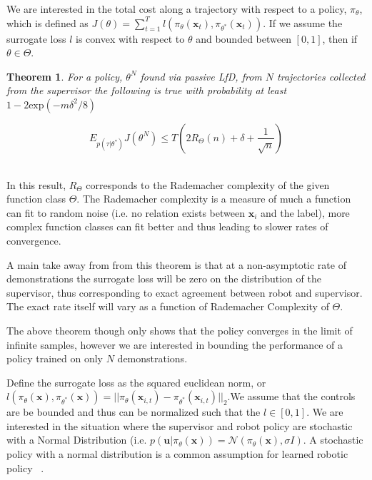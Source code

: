 \documentclass[10pt, conference]{ieeeconf}      %
\newtheorem{theorem}{Theorem}[section]
\newcommand{\bu}{\mathbf{u}}
\newcommand{\bx}{\mathbf{x}}
\begin{document}
We are interested in the total cost along a trajectory with respect to a policy, $\pi_{\theta}$, which is defined as $J(\theta) = \sum^T_{t=1} l(\pi_{\theta}(\bx_{t}),\pi_{\theta^*}(\bx_{t}))$.  If we assume the surrogate loss $l$ is convex with respect to $\theta$ and bounded between $[0,1]$, then if $\theta \in \Theta$. \\

\begin{theorem}\label{thm:sup}
For a policy, $\theta^N$ found via passive LfD, from $N$ trajectories collected from the supervisor the following is true with probability at least $1- 2\mbox{exp} (-m\delta^2/8)$

$$E_{p(\tau|\theta^*)} J(\theta^N)\leq T( 2R_{\Theta}(n) + \delta+ \frac{1}{\sqrt{n}})$$\\

\end{theorem}

In this result, $R_{\Theta}$ corresponds to the Rademacher complexity of the given function class $\Theta$. The Rademacher complexity is a measure of much a function can fit to random noise (i.e. no relation exists between $\bx_i$ and the label), more complex function classes can fit better and thus leading to slower rates of convergence.

A main take away from from this theorem  is that at a non-asymptotic rate of demonstrations the surrogate loss will be zero on the distribution of the supervisor, thus corresponding to exact agreement between robot and supervisor. The exact rate itself will vary as a function of Rademacher Complexity of $\Theta$. 

The above theorem though only shows that the policy converges in the limit of infinite samples, however we are interested in bounding the performance of a policy trained on only $N$ demonstrations. 

 Define the surrogate loss as the squared euclidean norm, or $l(\pi_{\theta}(\bx),\pi_{\theta^*}(\bx)) = ||\pi_{\theta}(\bx_{i,t}) - \pi_{\theta^*}(\bx_{i,t})||_2$.We assume that the controls are be bounded and thus can be normalized such that the $l \in [0,1]$.  We are interested in the situation where the supervisor and robot policy are stochastic with a Normal Distribution (i.e. $p(\bu|\pi_{\theta}(\bx)) = \mathcal{N}(\pi_\theta(\bx),\sigma I)$. A stochastic policy with a normal distribution is a common assumption for learned robotic policy ~\cite{levine2015end}. 
 
\end{document}
